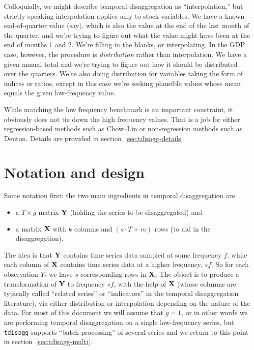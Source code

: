 Colloquially, we might describe temporal disaggregation as
``interpolation,'' but strictly speaking interpolation applies only to
stock variables. We have a known end-of-quarter value (say), which is
also the value at the end of the last month of the quarter, and we're
trying to figure out what the value might have been at the end of
months 1 and 2. We're filling in the blanks, or interpolating. In the
GDP case, however, the procedure is \textit{distribution} rather than
interpolation. We have a given annual total and we're trying to figure
out how it should be distributed over the quarters. We're also doing
distribution for variables taking the form of indices or ratios,
except in this case we're seeking plausible values whose mean equals
the given low-frequency value.

While matching the low frequency benchmark is an important constraint,
it obviously does not tie down the high frequency values. That is a
job for either regression-based methods such as Chow--Lin or
non-regression methods such as Denton. Details are provided in
section~\ref{sec:tdisagg-details}.

\section{Notation and design}
\label{sec:tdisagg-nd}

Some notation first: the two main ingredients in temporal
disaggregation are
\begin{itemize}
\item a $T \times g$ matrix $\mathbf{Y}$ (holding the series to be
  disaggregated) and
\item a matrix $\mathbf{X}$ with $k$ columns and $(s \cdot T + m)$ rows (to
  aid in the disaggregation).
\end{itemize}
The idea is that $\mathbf{Y}$ contains time series data sampled at some
frequency $f$, while each column of $\mathbf{X}$ contains time series data at
a higher frequency, $sf$. So for each observation $Y_t$ we have $s$
corresponding rows in $\mathbf{X}$. The object is to produce a transformation
of $\mathbf{Y}$ to frequency $sf$, with the help of $\mathbf{X}$ (whose columns are
typically called ``related series'' or ``indicators'' in the temporal
disaggregation literature), via either distribution or interpolation
depending on the nature of the data. For most of this document we will
assume that $g = 1$, or in other words we are performing temporal
disaggregation on a single low-frequency series, but \texttt{tdisagg}
supports ``batch processing'' of several series and we return to this
point in section~\ref{sec:tdisagg-multi}.


